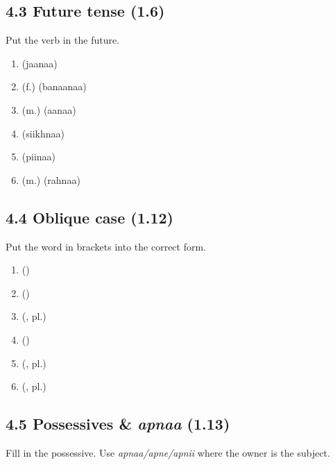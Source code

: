 \subsection{4.3 Future tense (1.6)}

Put the verb in the future.

\begin{enumerate}
  \item {} \hfill (jaanaa)
  \item {} (f.)  \hfill (banaanaa)
  \item {} (m.)  \hfill (aanaa)
  \item {} \hfill (siikhnaa)
  \item {} \hfill (piinaa)
  \item {} (m.)  \hfill (rahnaa)
\end{enumerate}

\subsection{4.4 Oblique case (1.12)}

Put the word in brackets into the correct form.

\begin{enumerate}
  \item {} \hfill ()
  \item {} \hfill ()
  \item {} \hfill (, pl.)
  \item {} \hfill ()
  \item {} \hfill (, pl.)
  \item {} \hfill (, pl.)
\end{enumerate}

\subsection{4.5 Possessives \& \textit{apnaa} (1.13)}

Fill in the possessive. Use \textit{apnaa/apne/apnii} where the owner is the subject.

